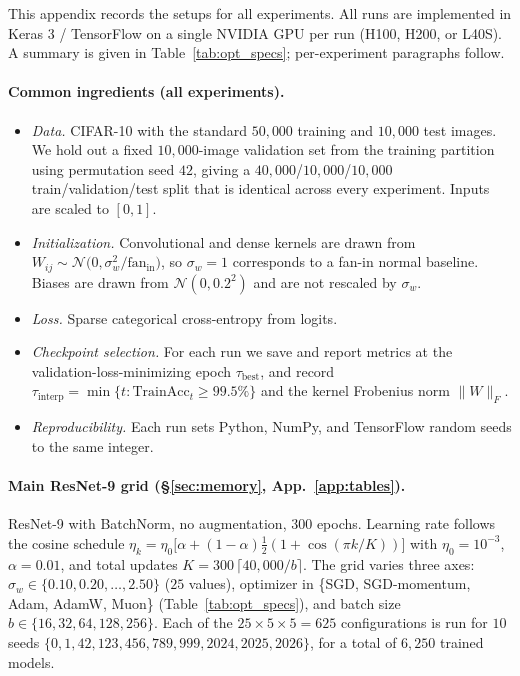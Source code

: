 \documentclass{article}
\newcommand{\TrainAcc}{\mathrm{TrainAcc}}
\newcommand{\taubest}{\tau_{\mathrm{best}}}
\newcommand{\tauinterp}{\tau_{\mathrm{interp}}}
\begin{document}
This appendix records the setups for all experiments. All runs are
implemented in Keras 3 / TensorFlow on a single NVIDIA GPU per run
(H100, H200, or L40S). A summary is given in
Table~\ref{tab:opt_specs}; per-experiment paragraphs follow.

\paragraph{Common ingredients (all experiments).}
\begin{itemize}[leftmargin=1.2em,itemsep=0.05em]
\item \emph{Data.} CIFAR-10 with the standard $50{,}000$ training and
$10{,}000$ test images. We hold out a fixed $10{,}000$-image validation
set from the training partition using permutation seed $42$, giving a
$40{,}000$/$10{,}000$/$10{,}000$ train/validation/test split that is
identical across every experiment. Inputs are scaled to $[0,1]$.
\item \emph{Initialization.} Convolutional and dense kernels are drawn
from $W_{ij}\sim\mathcal N\!\big(0,\sigma_w^{2}/\mathrm{fan}_{\mathrm{in}}\big)$,
so $\sigma_w=1$ corresponds to a fan-in normal baseline. Biases
are drawn from $\mathcal N(0,0.2^{2})$ and are not rescaled by $\sigma_w$.
\item \emph{Loss.} Sparse categorical cross-entropy from logits.
\item \emph{Checkpoint selection.} For each run we save and report
metrics at the validation-loss-minimizing epoch $\taubest$, and record
$\tauinterp=\min\{t:\TrainAcc_t\ge 99.5\%\}$ and the kernel Frobenius
norm $\|W\|_F$.
\item \emph{Reproducibility.} Each run sets Python, NumPy, and
TensorFlow random seeds to the same integer.
\end{itemize}


\paragraph{Main ResNet-9 grid (\S\ref{sec:memory}, App.~\ref{app:tables}).}
ResNet-9 with BatchNorm, no augmentation, $300$ epochs. Learning rate
follows the cosine schedule
$\eta_k = \eta_0\big[\alpha + (1-\alpha)\tfrac{1}{2}(1+\cos(\pi k/K))\big]$
with $\eta_0=10^{-3}$, $\alpha=0.01$, and total updates
$K=300\,\lceil 40{,}000/b\rceil$. The grid varies three axes:
$\sigma_w\in\{0.10,0.20,\ldots,2.50\}$ ($25$ values), optimizer in
\{SGD, SGD-momentum, Adam, AdamW, Muon\} (Table~\ref{tab:opt_specs}),
and batch size $b\in\{16,32,64,128,256\}$. Each of the
$25\times 5\times 5=625$ configurations is run for $10$ seeds
$\{0,1,42,123,456,789,999,2024,2025,2026\}$, for a total of $6{,}250$
trained models.
\end{document}

